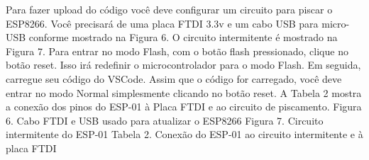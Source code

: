 Para fazer upload do código você deve configurar um circuito para piscar o ESP8266. Você precisará de uma placa FTDI 3.3v e um cabo USB para micro-USB conforme mostrado na Figura 6. O circuito intermitente é mostrado na Figura 7. Para entrar no modo Flash, com o botão flash pressionado, clique no botão reset. Isso irá redefinir o microcontrolador para o modo Flash. Em seguida, carregue seu código do VSCode. Assim que o código for carregado, você deve entrar no modo Normal simplesmente clicando no botão reset. A Tabela 2 mostra a conexão dos pinos do ESP-01 à Placa FTDI e ao circuito de piscamento.
Figura 6. Cabo FTDI e USB usado para atualizar o ESP8266
Figura 7. Circuito intermitente do ESP-01
Tabela 2. Conexão do ESP-01 ao circuito intermitente e à placa FTDI

